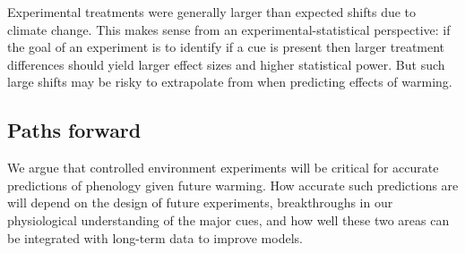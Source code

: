 \documentclass[11pt,letter]{article}
\begin{document}
Experimental treatments were generally larger than expected shifts due to climate change. This makes sense from an experimental-statistical perspective: if the goal of an experiment is to identify if a cue is present then larger treatment differences should yield larger effect sizes and higher statistical power. But such large shifts may be risky to extrapolate from when predicting effects of warming.   %

\subsection{Paths forward} 
We argue that controlled environment experiments will be critical for accurate predictions of phenology given future warming. How accurate such predictions are will depend on the design of future experiments, breakthroughs in our physiological understanding of the major cues, and how well these two areas can be integrated with long-term data to improve models. \\
\end{document}

